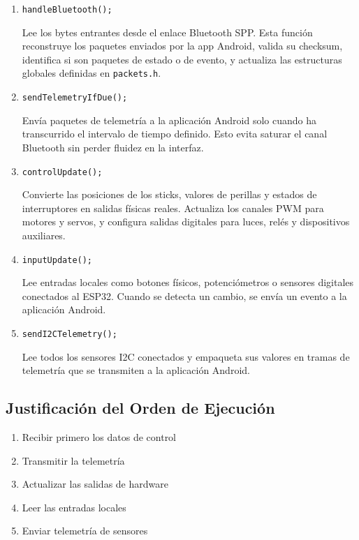 \documentclass[12pt,a4paper]{article}
\newcommand{\ardfn}[1]{\texttt{\textcolor{arduinoOrange}{#1}}}
\begin{document}
\begin{enumerate}
	\item  \ardfn{handleBluetooth}\texttt{();}
	
	Lee los bytes entrantes desde el enlace Bluetooth SPP. Esta función
	reconstruye los paquetes enviados por la app Android, valida su
	checksum, identifica si son paquetes de estado o de evento, y actualiza
	las estructuras globales definidas en \texttt{packets.h}.
	
	\item  \ardfn{sendTelemetryIfDue}\texttt{();}
	
	Envía paquetes de telemetría a la aplicación Android solo cuando ha
	transcurrido el intervalo de tiempo definido. Esto evita saturar el
	canal Bluetooth sin perder fluidez en la interfaz.
	
	\item  \ardfn{controlUpdate}\texttt{();}
	
	Convierte las posiciones de los sticks, valores de perillas y estados
	de interruptores en salidas físicas reales. Actualiza los canales PWM
	para motores y servos, y configura salidas digitales para luces,
	relés y dispositivos auxiliares.
	
	\item  \ardfn{inputUpdate}\texttt{();}
	
	Lee entradas locales como botones físicos, potenciómetros o sensores
	digitales conectados al ESP32. Cuando se detecta un cambio, se envía
	un evento a la aplicación Android.
	
	\item  \ardfn{sendI2CTelemetry}\texttt{();}
	
	Lee todos los sensores I2C conectados y empaqueta sus valores en
	tramas de telemetría que se transmiten a la aplicación Android.
\end{enumerate}

\subsection*{Justificación del Orden de Ejecución}

\begin{enumerate}
	\item Recibir primero los datos de control
	\item Transmitir la telemetría
	\item Actualizar las salidas de hardware
	\item Leer las entradas locales
	\item Enviar telemetría de sensores
\end{enumerate}
\end{document}
